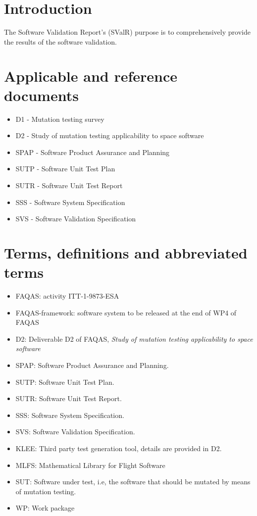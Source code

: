 
\chapter{Introduction}

The Software Validation Report’s (SValR) purpose is to comprehensively provide the results of the software validation.

\chapter{Applicable and reference documents}

\begin{itemize}
\item{D1 - Mutation testing survey}
\item{D2 - Study of mutation testing applicability to space software}
\item{SPAP - Software Product Assurance and Planning}
\item{SUTP - Software Unit Test Plan}
\item{SUTR - Software Unit Test Report}
\item{SSS - Software System Specification}
\item{SVS - Software Validation Specification}

\end{itemize}

\chapter{Terms, definitions and abbreviated terms}

\begin{itemize}
\item{FAQAS}: activity ITT-1-9873-ESA
\item{FAQAS-framework}: software system to be released at the end of WP4 of FAQAS
\item{D2}: Deliverable D2 of FAQAS, \emph{Study of mutation testing applicability to space software}
\item{SPAP}: Software Product Assurance and Planning.
\item{SUTP}: Software Unit Test Plan.
\item{SUTR}: Software Unit Test Report.
\item{SSS}: Software System Specification.
\item{SVS}: Software Validation Specification.
\item{KLEE}: Third party test generation tool, details are provided in D2.
\item{MLFS}: Mathematical Library for Flight Software
\item{SUT}: Software under test, i.e, the software that should be mutated by means of mutation testing.
\item{WP}: Work package

\end{itemize}


\clearpage
